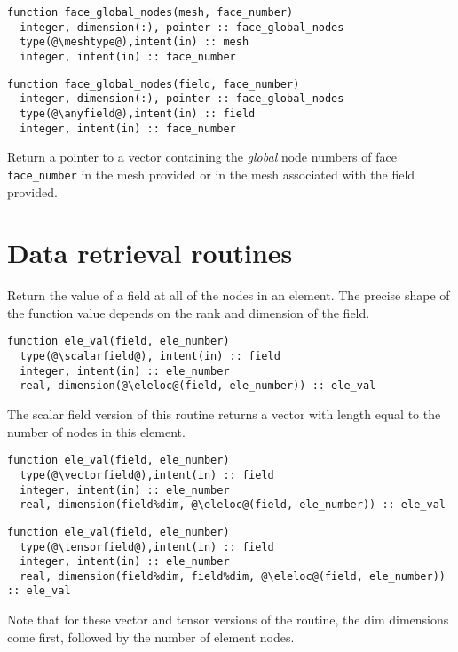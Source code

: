 \documentclass[a4paper, 11pt]{book}
\begin{document}

\begin{lstlisting}
function face_global_nodes(mesh, face_number)
  integer, dimension(:), pointer :: face_global_nodes
  type(@\meshtype@),intent(in) :: mesh
  integer, intent(in) :: face_number  
\end{lstlisting}

\begin{lstlisting}
function face_global_nodes(field, face_number)
  integer, dimension(:), pointer :: face_global_nodes
  type(@\anyfield@),intent(in) :: field
  integer, intent(in) :: face_number  
\end{lstlisting}

Return a pointer to a vector containing the \emph{global} node numbers of
face \lstinline+face_number+ in the  mesh provided or in the mesh
associated with the field provided. 

\section{Data retrieval routines}


Return the value of a field at all of the nodes in an element. The precise
shape of the function value depends on the rank and dimension of the field.

\begin{lstlisting}
function ele_val(field, ele_number) 
  type(@\scalarfield@), intent(in) :: field
  integer, intent(in) :: ele_number
  real, dimension(@\eleloc@(field, ele_number)) :: ele_val
\end{lstlisting}
The scalar field version of this routine returns a vector with length equal
to the number of nodes in this element.

\begin{lstlisting}
function ele_val(field, ele_number)
  type(@\vectorfield@),intent(in) :: field
  integer, intent(in) :: ele_number
  real, dimension(field%dim, @\eleloc@(field, ele_number)) :: ele_val
\end{lstlisting}
\begin{lstlisting}
function ele_val(field, ele_number)
  type(@\tensorfield@),intent(in) :: field
  integer, intent(in) :: ele_number
  real, dimension(field%dim, field%dim, @\eleloc@(field, ele_number)) :: ele_val
\end{lstlisting}
Note that for these vector and tensor versions of the routine, the dim
dimensions come first, followed by the number of element nodes.
\end{document}
